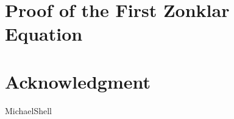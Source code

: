 \documentclass[9pt,technote]{IEEEtran}
\begin{document}
\section{Proof of the First Zonklar Equation}


\section*{Acknowledgment}


\begin{IEEEbiography}[Hola]{MichaelShell}
\end{IEEEbiography}


\end{document}
